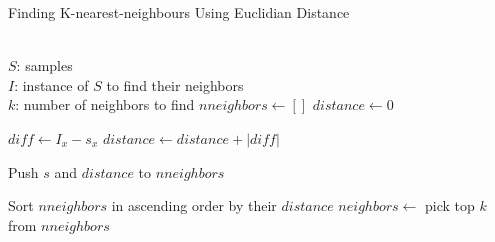 \documentclass[english]{beamer}
\begin{document}
\begin{frame}
	{Finding K-nearest-neighbours}
	{Using Euclidian Distance}
	\footnotesize
	\begin{algorithmic}[1]
		\Require \\
		$ S $: samples \\
		$ I $: instance of $S$ to find their neighbors \\
		$ k $: number of neighbors to find
			\State $ nneighbors \gets [] $
				\State $ distance \gets 0 $

					\State $ diff \gets I_{x} - s_{x} $
					\State $ distance \gets distance + |diff| $
				\EndFor

				\State Push $s$ and $distance$ to $nneighbors$
			\EndFor

			\State Sort $nneighbors$ in ascending order by their $distance$
			\State $neighbors \gets $ pick top $k$ from $nneighbors$
			\State {}
		\EndFunction
	\end{algorithmic}
\end{frame}
\end{document}
